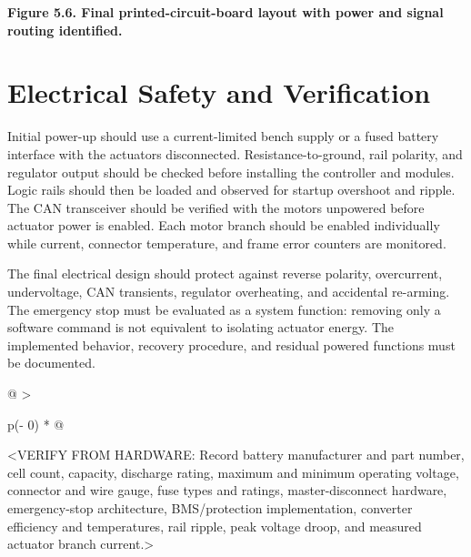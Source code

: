 \begin{center}\singlespacing
{}
\textbf{Figure 5.6. Final printed-circuit-board layout with power and signal routing identified.}
\end{center}

\section{Electrical Safety and Verification}\label{electrical-safety-and-verification}

Initial power-up should use a current-limited bench supply or a fused
battery interface with the actuators disconnected. Resistance-to-ground,
rail polarity, and regulator output should be checked before installing
the controller and modules. Logic rails should then be loaded and
observed for startup overshoot and ripple. The CAN transceiver should be
verified with the motors unpowered before actuator power is enabled.
Each motor branch should be enabled individually while current,
connector temperature, and frame error counters are monitored.

The final electrical design should protect against reverse polarity,
overcurrent, undervoltage, CAN transients, regulator overheating, and
accidental re-arming. The emergency stop must be evaluated as a system
function: removing only a software command is not equivalent to
isolating actuator energy. The implemented behavior, recovery procedure,
and residual powered functions must be documented.

\begin{longtable}[]{@{}
  >{\raggedright\arraybackslash}p{(\columnwidth - 0\tabcolsep) * }@{}}
\toprule\noalign{}
\begin{minipage}[b]{\linewidth}\raggedright
\textless VERIFY FROM HARDWARE: Record battery manufacturer and part
number, cell count, capacity, discharge rating, maximum and minimum
operating voltage, connector and wire gauge, fuse types and ratings,
master-disconnect hardware, emergency-stop architecture, BMS\slash{}protection
implementation, converter efficiency and temperatures, rail ripple, peak
voltage droop, and measured actuator branch current.\textgreater{}
\end{minipage} \\
\midrule\noalign{}
\endhead
\bottomrule\noalign{}
\endlastfoot
\end{longtable}
